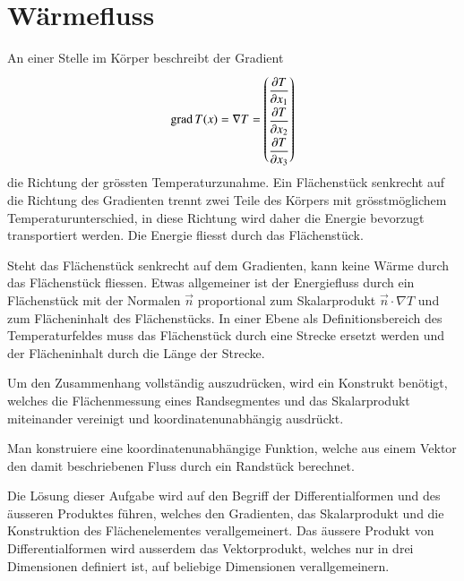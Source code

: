 %
%
%

%
%
\section{Wärmefluss
\label{buch:fallstudie:waermefluss}}
An einer Stelle im Körper beschreibt der Gradient
\[
\operatorname{grad} T(x)
=
\nabla T
=
\renewcommand{\arraystretch}{1.9}
\begin{pmatrix}
\displaystyle \frac{\partial T}{\partial x_1}\\
\displaystyle \frac{\partial T}{\partial x_2}\\
\displaystyle \frac{\partial T}{\partial x_3}
\end{pmatrix}
\]
die Richtung der grössten Temperaturzunahme.
Ein Flächenstück senkrecht auf die Richtung des Gradienten
trennt zwei Teile des Körpers mit grösstmöglichem Temperaturunterschied,
in diese Richtung wird daher die Energie bevorzugt transportiert werden.
Die Energie fliesst durch das Flächenstück.

Steht das Flächenstück senkrecht auf dem Gradienten, kann keine
Wärme durch das Flächenstück fliessen.
Etwas allgemeiner ist der Energiefluss durch ein Flächenstück mit der
%
Normalen $\vec{n}$ proportional zum Skalarprodukt $\vec{n}\cdot\nabla T$
und zum Flächeninhalt des Flächenstücks.
In einer Ebene als Definitionsbereich des Temperaturfeldes muss
das Flächenstück durch eine Strecke ersetzt werden und der Flächeninhalt
durch die Länge der Strecke.

Um den Zusammenhang vollständig auszudrücken, wird ein Konstrukt 
benötigt, welches die Flächenmessung eines Randsegmentes und das
Skalarprodukt miteinander vereinigt und koordinatenunabhängig
ausdrückt.

\begin{aufgabe}
Man konstruiere eine koordinatenunabhängige Funktion, welche aus einem
Vektor den damit beschriebenen Fluss durch ein Randstück berechnet.
\end{aufgabe}

Die Lösung dieser Aufgabe wird auf den Begriff der Differentialformen
und des äusseren Produktes führen, welches den Gradienten, das Skalarprodukt
und die Konstruktion des Flächenelementes verallgemeinert.
Das äussere Produkt von Differentialformen wird ausserdem das
%
Vektorprodukt, welches nur in drei Dimensionen definiert ist, auf beliebige
Dimensionen verallgemeinern.

